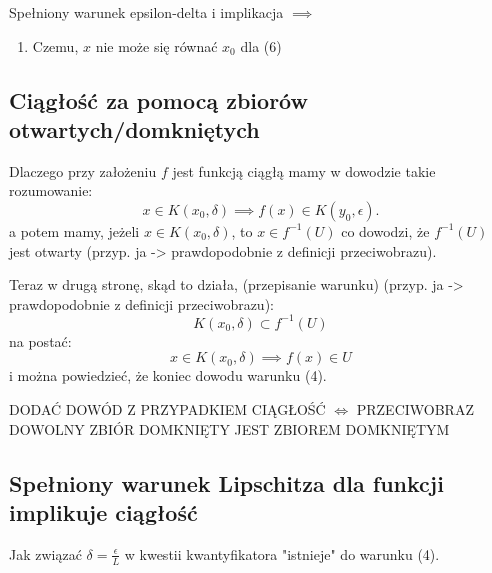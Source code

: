 \documentclass{article}
\begin{document}
Spełniony warunek epsilon-delta i implikacja \(\implies\)

\begin{enumerate}
    \item Czemu, \(x\) nie może się równać \(x_0\) dla (6)
\end{enumerate}

\subsection{Ciągłość za pomocą zbiorów otwartych/domkniętych}

Dlaczego przy założeniu \(f\) jest funkcją ciągłą mamy w dowodzie takie rozumowanie:
\begin{equation*}
    x \in K(x_0, \delta) \implies f(x) \in K(y_0, \epsilon).
\end{equation*}
a potem mamy, jeżeli \(x \in K(x_0, \delta)\), to \(x \in f^{-1}(U)\) co dowodzi, że \(f^{-1}(U)\)
jest otwarty (przyp. ja -> prawdopodobnie z definicji przeciwobrazu).\par
%
Teraz w drugą stronę, skąd to działa, (przepisanie warunku) (przyp. ja -> prawdopodobnie z definicji przeciwobrazu):
\begin{equation*}
    K(x_0, \delta) \subset f^{-1}(U)
\end{equation*}
na postać:
\begin{equation*}
    x \in K(x_0, \delta) \implies f(x) \in U
\end{equation*}
i można powiedzieć, że koniec dowodu warunku (4).

\begin{center}
    DODAĆ DOWÓD Z PRZYPADKIEM CIĄGŁOŚĆ \(\iff\) PRZECIWOBRAZ DOWOLNY ZBIÓR DOMKNIĘTY JEST ZBIOREM DOMKNIĘTYM
\end{center}

\subsection{Spełniony warunek Lipschitza dla funkcji implikuje ciągłość}

Jak związać \(\delta = \frac{\epsilon}{L}\) w kwestii kwantyfikatora "istnieje" do warunku (4).
\end{document}
